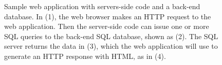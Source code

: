 \begin{figure}[tb]
  \centering
  \caption[Sample web application with server-side code and a
    database.]{Sample web application with servers-side code and a
    back-end database. In (1), the web browser makes an HTTP request
    to the web application. Then the server-side code can issue one or
    more SQL queries to the back-end SQL database, shown as (2). The
    SQL server returns the data in (3), which the web application will
    use to generate an HTTP response with HTML, as in (4).}
\end{figure}
